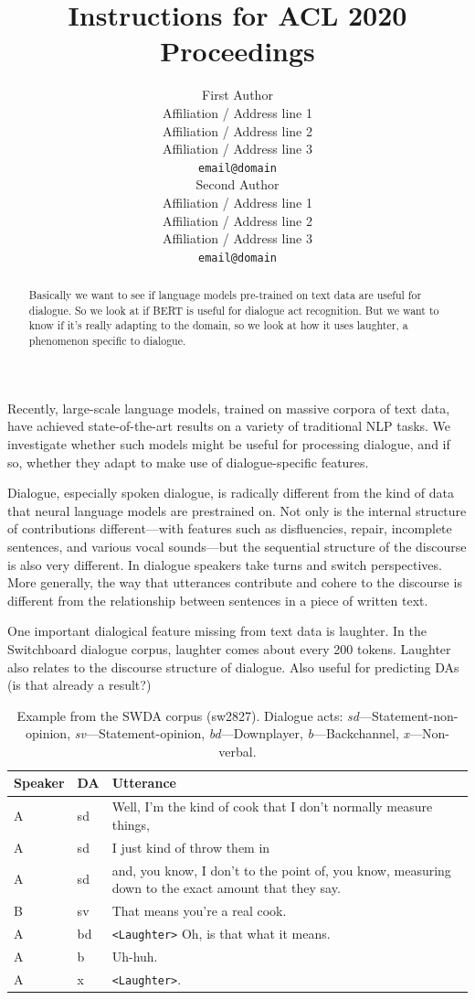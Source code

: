 \documentclass[11pt,a4paper]{article}
\title{Instructions for ACL 2020 Proceedings}
\author{First Author \\
  Affiliation / Address line 1 \\
  Affiliation / Address line 2 \\
  Affiliation / Address line 3 \\
  \texttt{email@domain} \\\And
  Second Author \\
  Affiliation / Address line 1 \\
  Affiliation / Address line 2 \\
  Affiliation / Address line 3 \\
  \texttt{email@domain} \\}
\date{}
\begin{document}
\maketitle
\begin{abstract}
  Basically we want to see if language models pre-trained on text data are useful for dialogue.
  So we look at if BERT is useful for dialogue act recognition.
  But we want to know if it's really adapting to the domain, so we look at how it uses laughter, a phenomenon specific to dialogue.
\end{abstract}


Recently, large-scale language models, trained on massive corpora of text data, have achieved state-of-the-art results on a variety of traditional NLP tasks.
We investigate whether such models might be useful for processing dialogue, and if so, whether they adapt to make use of dialogue-specific features.

Dialogue, especially spoken dialogue, is radically different from the kind of data that neural language models are prestrained on.
Not only is the internal structure of contributions different---with features such as disfluencies, repair, incomplete sentences, and various vocal sounds---but the sequential structure of the discourse is also very different.
In dialogue speakers take turns and switch perspectives.
More generally, the way that utterances contribute and cohere to the discourse is different from the relationship between sentences in a piece of written text.

One important dialogical feature missing from text data is laughter.
In the Switchboard dialogue corpus, laughter comes about every 200 tokens.
Laughter also relates to the discourse structure of dialogue. 
Also useful for predicting DAs (is that already a result?)

\begin{table}
  \centering
  \begin{tabularx}{\linewidth}{llL}
    \toprule
    Speaker & DA & Utterance \\ \midrule
    A	&sd	& Well, I'm the kind of cook that I don't normally measure things,  \\
    A	&sd	& I just kind of throw them in \\
    A	&sd	& and, you know, I don't to the point of, you know, measuring down to the exact amount that they say.  \\
    B	&sv	& That means you're a real cook. \\
    A	&bd	& \texttt{<Laughter>} Oh, is that what it means.  \\
    A	&b	& Uh-huh.  \\
    A	&x	& \texttt{<Laughter>}.\\
             \bottomrule
  \end{tabularx}
  \caption{Example from the SWDA corpus (sw2827). Dialogue acts: \emph{sd}---Statement-non-opinion, \emph{sv}---Statement-opinion, \emph{bd}---Downplayer, \emph{b}---Backchannel, \emph{x}---Non-verbal. }
\end{table}
\end{document}
